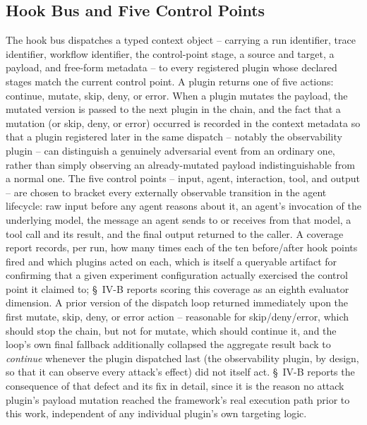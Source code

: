 \documentclass[conference]{IEEEtran}
\begin{document}
\subsection{Hook Bus and Five Control Points}
The hook bus dispatches a typed context object -- carrying a run identifier, trace identifier, workflow identifier, the control-point stage, a source and target, a payload, and free-form metadata -- to every registered plugin whose declared stages match the current control point. A plugin returns one of five actions: continue, mutate, skip, deny, or error. When a plugin mutates the payload, the mutated version is passed to the next plugin in the chain, and the fact that a mutation (or skip, deny, or error) occurred is recorded in the context metadata so that a plugin registered later in the same dispatch -- notably the observability plugin -- can distinguish a genuinely adversarial event from an ordinary one, rather than simply observing an already-mutated payload indistinguishable from a normal one. The five control points -- input, agent, interaction, tool, and output -- are chosen to bracket every externally observable transition in the agent lifecycle: raw input before any agent reasons about it, an agent's invocation of the underlying model, the message an agent sends to or receives from that model, a tool call and its result, and the final output returned to the caller. A coverage report records, per run, how many times each of the ten before/after hook points fired and which plugins acted on each, which is itself a queryable artifact for confirming that a given experiment configuration actually exercised the control point it claimed to; \S~IV-B reports scoring this coverage as an eighth evaluator dimension. A prior version of the dispatch loop returned immediately upon the first mutate, skip, deny, or error action -- reasonable for skip/deny/error, which should stop the chain, but not for mutate, which should continue it, and the loop's own final fallback additionally collapsed the aggregate result back to \emph{continue} whenever the plugin dispatched last (the observability plugin, by design, so that it can observe every attack's effect) did not itself act. \S~IV-B reports the consequence of that defect and its fix in detail, since it is the reason no attack plugin's payload mutation reached the framework's real execution path prior to this work, independent of any individual plugin's own targeting logic.
\end{document}
